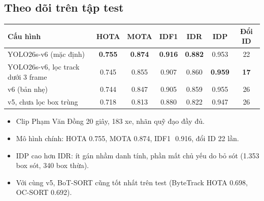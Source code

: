 \documentclass[aspectratio=\mlwAspectRatio, \mlwBaseSize, t]{beamer}
\begin{document}
\subsection{Theo dõi trên tập test}
\begin{frame}{\stitle}
  \centering
  \small
  \begin{tabular}{@{}lcccccc@{}}
    \toprule
    \textbf{Cấu hình} & \textbf{HOTA} & \textbf{MOTA} & \textbf{IDF1} & \textbf{IDR} & \textbf{IDP} & \textbf{Đổi ID} \\
    \midrule
    \rowcolor{HiRow}
    YOLO26s-v6 (mặc định) & \textbf{0.755} & \textbf{0.874} & \textbf{0.916} & \textbf{0.882} & 0.953 & 22 \\
    YOLO26s-v6, lọc track dưới 3 frame & 0.745 & 0.855 & 0.907 & 0.860 & \textbf{0.959} & \textbf{17} \\
    v6 (bản nhẹ) & 0.744 & 0.847 & 0.905 & 0.859 & 0.955 & 26 \\
    v5, chưa lọc box trùng & 0.718 & 0.813 & 0.880 & 0.822 & 0.947 & 26 \\
    \bottomrule
  \end{tabular}\par
  \vspace{0.6em}
  \begin{itemize}
    \item Clip Phạm Văn Đồng 20 giây, 183 xe, nhãn quỹ đạo đầy đủ.
    \item Mô hình chính: \alert{HOTA 0.755, MOTA 0.874, IDF1~\,0.916}, đổi ID 22 lần.
    \item IDP cao hơn IDR: ít gán nhầm danh tính, phần mất chủ yếu do bỏ sót (1.353 box sót, 340 box thừa).
    \item Với cùng v5, BoT-SORT cũng tốt nhất trên test (ByteTrack HOTA 0.698, OC-SORT 0.692).
  \end{itemize}
\end{frame}
\end{document}
